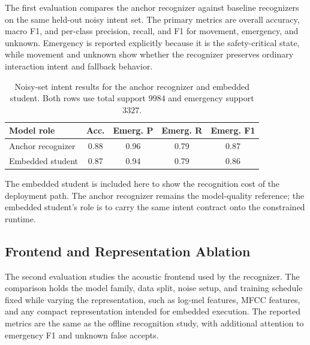 The first evaluation compares the anchor recognizer against baseline recognizers on the same held-out noisy intent set. The primary metrics are overall accuracy, macro F1, and per-class precision, recall, and F1 for movement, emergency, and unknown. Emergency is reported explicitly because it is the safety-critical state, while movement and unknown show whether the recognizer preserves ordinary interaction intent and fallback behavior.

\begin{table}[t]
    \centering
    \caption{Noisy-set intent results for the anchor recognizer and embedded student. Both rows use total support $9984$ and emergency support $3327$.}
    \label{tab:model_evidence}
    \begin{tabular}{lcccc}
        \toprule
        Model role & Acc. & Emerg. P & Emerg. R & Emerg. F1 \\
        \midrule
        Anchor recognizer & 0.88 & 0.96 & 0.79 & 0.87 \\
        Embedded student & 0.87 & 0.94 & 0.79 & 0.86 \\
        \bottomrule
    \end{tabular}
\end{table}

The embedded student is included here to show the recognition cost of the deployment path. The anchor recognizer remains the model-quality reference; the embedded student's role is to carry the same intent contract onto the constrained runtime.

\subsection{Frontend and Representation Ablation}

The second evaluation studies the acoustic frontend used by the recognizer. The comparison holds the model family, data split, noise setup, and training schedule fixed while varying the representation, such as log-mel features, MFCC features, and any compact representation intended for embedded execution. The reported metrics are the same as the offline recognition study, with additional attention to emergency F1 and unknown false accepts.

